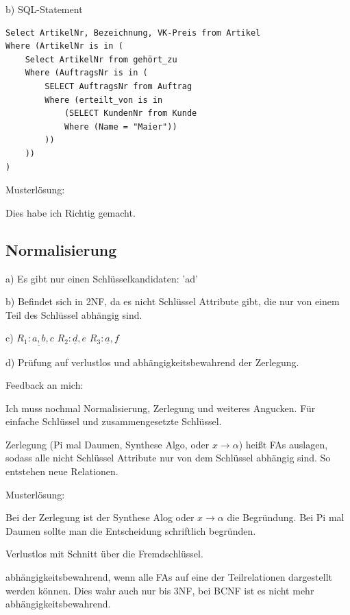 \documentclass[a4paper]{article}
\begin{document}
b) SQL-Statement

\begin{lstlisting}
Select ArtikelNr, Bezeichnung, VK-Preis from Artikel
Where (ArtikelNr is in (
    Select ArtikelNr from gehört_zu
    Where (AuftragsNr is in (
        SELECT AuftragsNr from Auftrag
        Where (erteilt_von is in 
            (SELECT KundenNr from Kunde
            Where (Name = "Maier"))
        ))
    ))
)
\end{lstlisting}

Musterlösung: 

Dies habe ich Richtig gemacht.

\subsection{Normalisierung}


a) Es gibt nur einen Schlüsselkandidaten: 'ad'

b) Befindet sich in 2NF, da es nicht Schlüssel Attribute gibt, die nur von einem Teil des Schlüssel abhängig sind.

c) $R_1: \underline{a,b},c$ $R_2: \underline{d},e$ $R_3: \underline{a},f$

d) Prüfung auf verlustlos und abhängigkeitsbewahrend der Zerlegung.



Feedback an mich:

Ich muss nochmal Normalisierung, Zerlegung und weiteres Angucken. Für einfache Schlüssel und zusammengesetzte Schlüssel.

Zerlegung (Pi mal Daumen, Synthese Algo, oder $x \to \alpha$) heißt FAs auslagen, sodass alle nicht Schlüssel Attribute nur von dem Schlüssel abhängig sind. So entstehen neue Relationen.

Musterlösung:

Bei der Zerlegung ist der Synthese Alog oder $x \to \alpha$ die Begründung. Bei Pi mal Daumen sollte man die Entscheidung schriftlich begründen.

Verlustlos mit Schnitt über die Fremdschlüssel.

abhängigkeitsbewahrend, wenn alle FAs auf eine der Teilrelationen dargestellt werden können. Dies wahr auch nur bis 3NF, bei BCNF ist es nicht mehr abhängigkeitsbewahrend.
\end{document}
